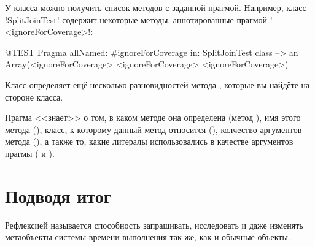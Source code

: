 \documentclass[a4paper,10pt,twoside]{book}
\begin{document}
У класса можно получить список методов с заданной прагмой. Например, класс \ct!SplitJoinTest! содержит некоторые методы, аннотированные прагмой \ct!<ignoreForCoverage>!:

\begin{code}{@TEST}
Pragma allNamed: #ignoreForCoverage in: SplitJoinTest class  --> an Array(<ignoreForCoverage> <ignoreForCoverage> <ignoreForCoverage>)
\end{code}

Класс  определяет ещё несколько разновидностей метода , которые вы найдёте на стороне класса.

Прагма <<знает>> о том, в каком методе она определена (метод ), имя этого метода (), класс, к которому данный метод относится (), колчество аргументов метода (), а также то, какие литералы использовались в качестве аргументов прагмы ( и ).


\section{Подводя итог}

Рефлексией называется способность запрашивать, исследовать и даже изменять метаобъекты системы времени выполнения так же, как и обычные объекты.
\end{document}
